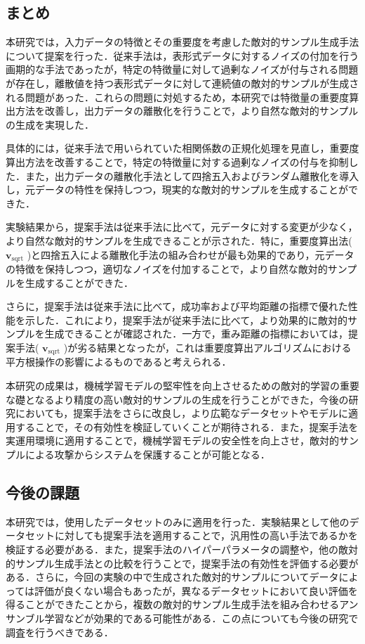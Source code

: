 \subsection{まとめ}
本研究では，入力データの特徴とその重要度を考慮した敵対的サンプル生成手法について提案を行った．従来手法は，表形式データに対するノイズの付加を行う画期的な手法であったが，特定の特徴量に対して過剰なノイズが付与される問題が存在し，離散値を持つ表形式データに対して連続値の敵対的サンプルが生成される問題があった．これらの問題に対処するため，本研究では特徴量の重要度算出方法を改善し，出力データの離散化を行うことで，より自然な敵対的サンプルの生成を実現した．

具体的には，従来手法で用いられていた相関係数の正規化処理を見直し，重要度算出方法を改善することで，特定の特徴量に対する過剰なノイズの付与を抑制した．また，出力データの離散化手法として四捨五入およびランダム離散化を導入し，元データの特性を保持しつつ，現実的な敵対的サンプルを生成することができた．

実験結果から，提案手法は従来手法に比べて，元データに対する変更が少なく，より自然な敵対的サンプルを生成できることが示された．特に，重要度算出法( $\bm{v}_{\mathrm{sqrt}}$ )と四捨五入による離散化手法の組み合わせが最も効果的であり，元データの特徴を保持しつつ，適切なノイズを付加することで，より自然な敵対的サンプルを生成することができた．

さらに，提案手法は従来手法に比べて，成功率および平均距離の指標で優れた性能を示した．これにより，提案手法が従来手法に比べて，より効果的に敵対的サンプルを生成できることが確認された．一方で，重み距離の指標においては，提案手法( $\bm{v}_{\mathrm{sqrt}}$ )が劣る結果となったが，これは重要度算出アルゴリズムにおける平方根操作の影響によるものであると考えられる．

本研究の成果は，機械学習モデルの堅牢性を向上させるための敵対的学習の重要な礎となるより精度の高い敵対的サンプルの生成を行うことができた，今後の研究においても，提案手法をさらに改良し，より広範なデータセットやモデルに適用することで，その有効性を検証していくことが期待される．また，提案手法を実運用環境に適用することで，機械学習モデルの安全性を向上させ，敵対的サンプルによる攻撃からシステムを保護することが可能となる．

\subsection{今後の課題}
本研究では，使用したデータセットのみに適用を行った．実験結果として他のデータセットに対しても提案手法を適用することで，汎用性の高い手法であるかを検証する必要がある．また，提案手法のハイパーパラメータの調整や，他の敵対的サンプル生成手法との比較を行うことで，提案手法の有効性を評価する必要がある．さらに，今回の実験の中で生成された敵対的サンプルについてデータによっては評価が良くない場合もあったが，異なるデータセットにおいて良い評価を得ることができたことから，複数の敵対的サンプル生成手法を組み合わせるアンサンブル学習などが効果的である可能性がある．この点についても今後の研究で調査を行うべきである．
